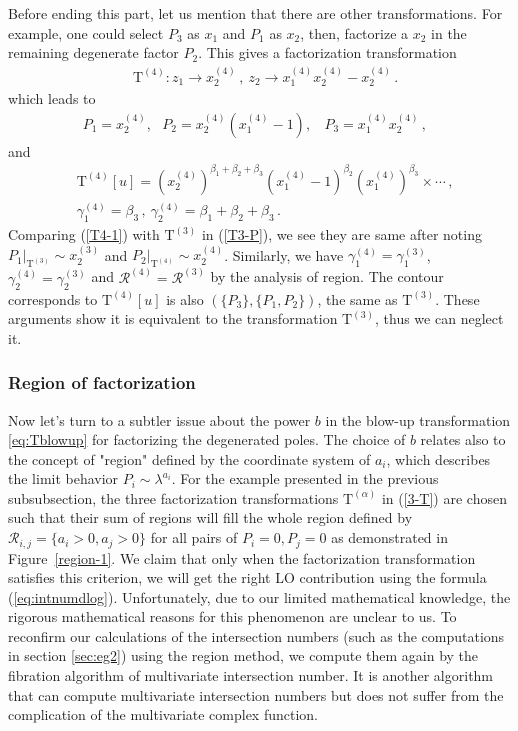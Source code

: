 \documentclass[a4paper,11pt]{article}
\newcommand{\nn}{\nonumber}
\newcommand{\nT}{\mathrm{T}}
\newcommand{\bea}{\begin{eqnarray}}
\newcommand{\eea}{\end{eqnarray}}
\def\eref#1{(\ref{#1})}
\begin{document}
Before ending this part, let us mention that there are other  transformations. For example, one could select $P_3$ as $x_1$ and $P_1$ as $x_2$, then, factorize a $x_2$ in the remaining degenerate factor $P_2$. This gives a factorization transformation
\begin{align}
&\nT^{(4)}: z_1\to x_2^{(4)}  \,,\  z_2\to x_1^{(4)}x_2^{(4)}-x_2^{(4)}\, .
\end{align}
which leads to 
%
\bea P_1=x_2^{(4)},~~~P_2=x_2^{(4)}(x_1^{(4)}-1),~~~~P_3=x_1^{(4)}x_2^{(4)} \, , ~~~\label{T4-1}\eea
%
and
\begin{align}
&\nT^{(4)}[u] =  \left(x_2^{(4)} \right)^{\beta_1 + \beta _2 + \beta_3} \left(x_1^{(4)}-1\right)^{\beta
   _2} 
 \left(x_1^{(4)}\right)^{\beta _3}  \times \cdots  \, , \nn\\
& \gamma^{(4)}_1=\beta_3 \,, \ \gamma^{(4)}_2=\beta_1+\beta_2+\beta_3  \, . ~~~\label{T4-2}
\end{align}
Comparing \eref{T4-1} with $\nT^{(3)}$ in \eref{T3-P}, we see they are same  after noting 
$P_1|_{\nT^{(3)}}\sim x_2^{(3)}$ and $P_2|_{\nT^{(4)}}\sim x_2^{(4)}$. 
Similarly, we have 
$\gamma^{(4)}_1 = \gamma^{(3)}_1$, $\gamma^{(4)}_2 = \gamma^{(3)}_2$ and $\mathcal{R}^{(4)} = \mathcal{R}^{(3)}$ by the analysis of region.
The  contour corresponds to $\nT^{(4)}[u]$ is also $(\{P_3\},\{P_1,P_2\})$, the same as $\nT^{(3)}$. These arguments show it is equivalent to the transformation $\nT^{(3)}$, thus we can neglect it. 

\subsubsection{Region of factorization}

Now let's turn to a subtler issue about the power $b$ in the blow-up transformation \eqref{eq:Tblowup} for factorizing the
degenerated poles. The choice of $b$ relates also to the concept of "region" defined by the coordinate system of 
$a_i$, which describes the limit behavior $P_i\sim \lambda^{a_i}$. For the example presented in the previous subsubsection, the three factorization transformations $\nT^{(\alpha)}$ in \eref{3-T} are chosen such that
their sum of regions will fill the whole region defined by $\mathcal{R}_{i,j}=\{a_i>0,a_j>0\}$ for all pairs of $P_i=0,P_j=0$ as demonstrated in Figure~\ref{region-1}. We claim that only when the factorization transformation
satisfies this criterion, we will get the right  LO contribution using the formula \eref{eq:intnumdlog}.
Unfortunately, due to our limited mathematical knowledge, the rigorous mathematical reasons for this phenomenon are unclear to us. To reconfirm our calculations of the intersection numbers (such as the computations in section \ref{sec:eg2}) using the region method, we compute them again by the fibration algorithm \cite{Frellesvig:2019uqt} of multivariate intersection number. It is another algorithm that can compute multivariate intersection numbers but does not suffer from the complication of the multivariate complex function. 
\end{document}
